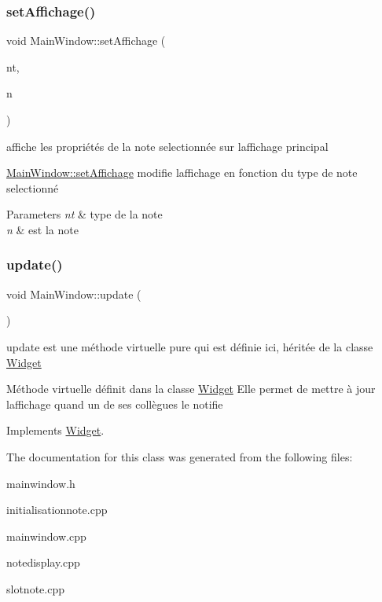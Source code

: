\subsubsection{\texorpdfstring{set\+Affichage()}{setAffichage()}}
{\footnotesize\ttfamily void Main\+Window\+::set\+Affichage (\begin{DoxyParamCaption}\item[{Note\+Type}]{nt,  }\item[{\hyperlink{classNote}{Note} \&}]{n }\end{DoxyParamCaption})}



affiche les propriétés de la note selectionnée sur l\textquotesingle{}affichage principal 

\hyperlink{classMainWindow_a379d0333137913ea4e2fe46bd123d815}{Main\+Window\+::set\+Affichage} modifie l\textquotesingle{}affichage en fonction du type de note selectionné


\begin{DoxyParams}{Parameters}
{\em nt} & type de la note \\
\hline
{\em n} & est la note \\
\hline
\end{DoxyParams}
\mbox{\label{classMainWindow_a128f71880d4b9683149023fc46fcc9f8}} 
\subsubsection{\texorpdfstring{update()}{update()}}
{\footnotesize\ttfamily void Main\+Window\+::update (\begin{DoxyParamCaption}{ }\end{DoxyParamCaption})\hspace{0.3cm}{\ttfamily [virtual]}}



update est une méthode virtuelle pure qui est définie ici, héritée de la classe \hyperlink{classWidget}{Widget} 

Méthode virtuelle définit dans la classe \hyperlink{classWidget}{Widget} Elle permet de mettre à jour l\textquotesingle{}affichage quand un de ses collègues le notifie 

Implements \hyperlink{classWidget}{Widget}.



The documentation for this class was generated from the following files\+:\begin{DoxyCompactItemize}
\item 
mainwindow.\+h\item 
initialisationnote.\+cpp\item 
mainwindow.\+cpp\item 
notedisplay.\+cpp\item 
slotnote.\+cpp\end{DoxyCompactItemize}

